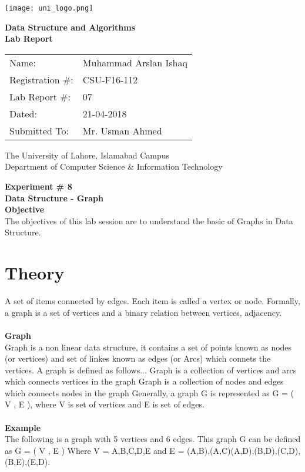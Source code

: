 \documentclass[11pt]{article}            %
\begin{document}
\begin{titlepage}
    \centering
  \vfill
    \texttt{[image: uni\_logo.png]} \\ 
	\vskip2cm
    {\bfseries\Large
	Data Structure and Algorithms \\ 
	
	\vskip2cm
	Lab Report 
	 
	\vskip2cm
	}    

\begin{center}
\begin{tabular}{ l l  } 

Name: & Muhammad Arslan Ishaq \\ 
Registration \#: & CSU-F16-112 \\ 
Lab Report \#: & 07 \\ 
 Dated:& 21-04-2018\\ 
Submitted To:& Mr. Usman Ahmed\\ 

\end{tabular}
\end{center}
    \vfill
    The University of Lahore, Islamabad Campus\\
Department of Computer Science \& Information Technology
\end{titlepage}


    
    {\bfseries\Large
\centering
	Experiment \# 8 \\

Data Structure - Graph \\
		}    
 \vskip1cm
 \textbf {Objective}\\  The objectives of this lab session are to understand the basic of Graphs in Data Structure.



\section{Theory }              
 A set of items connected by edges. Each item is called a vertex or node. Formally, a graph is a set of vertices and a binary relation between vertices, adjacency. \\  \\
\textbf{Graph}\\ 
Graph is a non linear data structure, it contains a set of points known as nodes (or vertices) and set of linkes known as edges (or Arcs) which connets the vertices. A graph is defined as follows...
Graph is a collection of vertices and arcs which connects vertices in the graph
Graph is a collection of nodes and edges which connects nodes in the graph
Generally, a graph G is represented as G = ( V , E ), where V is set of vertices and E is set of edges.
  \\ \\
\textbf{Example }\\
The following is a graph with 5 vertices and 6 edges.
This graph G can be defined as G = ( V , E )
Where V = {A,B,C,D,E} and E = {(A,B),(A,C)(A,D),(B,D),(C,D),(B,E),(E,D)}.
\end{document}
